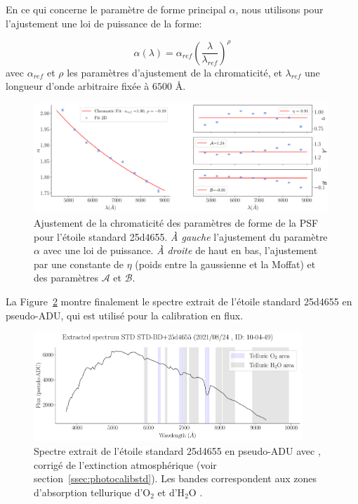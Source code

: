 \documentclass[../main/main.tex]{subfiles}
\begin{document}
En ce qui concerne le paramètre de forme principal $\alpha$, nous
utilisons pour l'ajustement une loi de puissance de la forme:

\begin{equation}
  \label{eq:alphachrom}
  \alpha(\lambda)=\alpha_{ref}\left(\frac{\lambda}{\lambda_{ref}}\right)^{\rho}
\end{equation}
avec $\alpha_{ref}$ et $\rho$ les paramètres d'ajustement de la
chromaticité, et $\lambda_{ref}$ une longueur d'onde arbitraire fixée à
$6500$ \AA.

\begin{figure}
  \centering
  \includegraphics[width=0.99\textwidth]{../figures/06_irf/chromaticity_psf.pdf}
  \caption[Chromaticité des paramètres de forme de la PSF]{Ajustement de
    la chromaticité
    des paramètres de forme de la PSF pour l'étoile standard
    25d4655. \emph{À gauche} l'ajustement du paramètre $\alpha$ avec une
  loi de puissance. \emph{À droite} de haut en bas, l'ajustement par une
constante de $\eta$ (poids entre la gaussienne et la Moffat) et des
paramètres $\mathcal{A}$ et $\mathcal{B}$. }
  \label{fig:chromaticity_psf}
\end{figure}

La Figure~\ref{fig:stdspectrumadu} montre finalement le spectre extrait de
l'étoile standard 25d4655 en pseudo-ADU, qui est utilisé pour la calibration
en flux. 

\begin{figure}
  \centering
  \includegraphics[width=0.9\textwidth]{../figures/06_irf/stdspectra_adu.pdf}
  \caption[Spectre extrait de l'étoile standard 25d4655 en
  pseudo-ADU.]{Spectre extrait de l'étoile standard 25d4655 en
    pseudo-ADU avec \hypergal, corrigé de l'extinction atmosphérique
    (voir section~\ref{ssec:photocalibstd}). Les bandes correspondent aux zones d'absorption
    tellurique d'O$_{2}$ et d'H$_{2}$O \citep{Buton2013}.}
  \label{fig:stdspectrumadu}
\end{figure}
\end{document}
